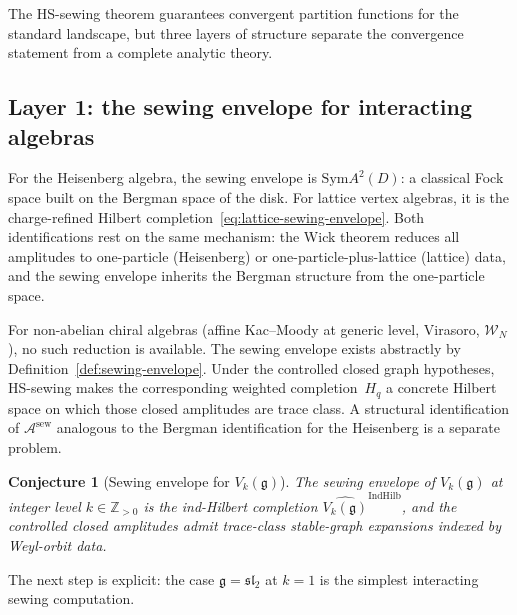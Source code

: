 \documentclass[11pt,reqno]{amsart}
\newtheorem{conjecture}[theorem]{Conjecture}
\theoremstyle{definition}
\theoremstyle{remark}
\newcommand{\cA}{\mathcal{A}}
\newcommand{\cW}{\mathcal{W}}
\newcommand{\bZ}{\mathbb{Z}}
\newcommand{\Sym}{\mathrm{Sym}}
\newcommand{\fg}{\mathfrak{g}}
\numberwithin{equation}{section}
\begin{document}
The HS-sewing theorem guarantees convergent partition functions
for the standard landscape, but three layers of structure
separate the convergence statement from a complete analytic
theory.

\subsection{Layer 1: the sewing envelope for interacting
 algebras}\label{subsec:gap-layer1}

For the Heisenberg algebra, the sewing envelope is
$\Sym A^2(D)$: a classical Fock space built on the
Bergman space of the disk.  For lattice vertex algebras, it is
the charge-refined Hilbert
completion~\eqref{eq:lattice-sewing-envelope}.  Both
identifications rest on the same mechanism: the Wick theorem
reduces all amplitudes to one-particle (Heisenberg) or
one-particle-plus-lattice (lattice) data, and the sewing
envelope inherits the Bergman structure from the one-particle
space.

For non-abelian chiral algebras (affine Kac--Moody at generic
level, Virasoro, $\cW_N$), no such reduction is available.
The sewing envelope exists abstractly by
Definition~\ref{def:sewing-envelope}. Under the controlled closed
graph hypotheses, HS-sewing makes the corresponding weighted
completion~$H_q$ a concrete Hilbert space on which those closed
amplitudes are trace class. A structural identification of
$\cA^{\mathrm{sew}}$ analogous to the Bergman identification for the
Heisenberg is a separate problem.

\begin{conjecture}[Sewing envelope for
 $V_k(\fg)$]\label{conj:sewing-envelope-km}
The sewing envelope of $V_k(\fg)$ at integer level
$k \in \bZ_{>0}$ is the ind-Hilbert completion
$\widehat{V_k(\fg)}^{\mathrm{IndHilb}}$, and the
controlled closed amplitudes admit trace-class stable-graph
expansions indexed by Weyl-orbit data.
\end{conjecture}

The next step is explicit: the case $\fg = \mathfrak{sl}_2$ at
$k = 1$ is the simplest interacting sewing computation.
\end{document}
